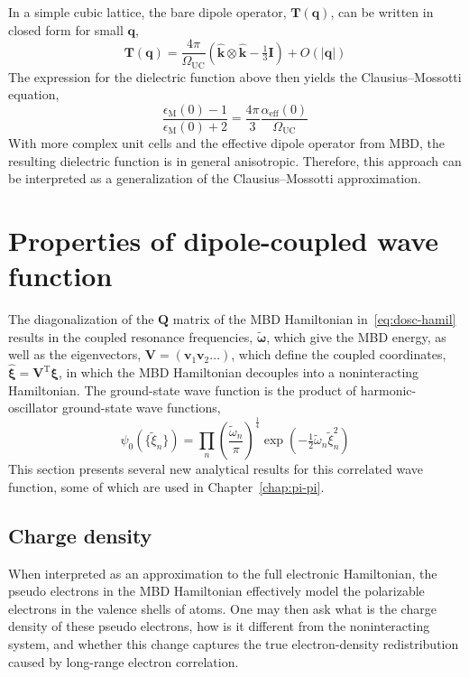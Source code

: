 In a simple cubic lattice, the bare dipole operator, $\mathbf T(\mathbf q)$, can be written in closed form for small $\mathbf q$,
\begin{equation}
  \mathbf T(\mathbf q)=\frac{4\pi}{\Omega_{\text{UC}}}(\hat{\mathbf k}\otimes\hat{\mathbf k}-\tfrac13\mathbf I)+O(|\mathbf q|)
\end{equation}
The expression for the dielectric function above then yields the Clausius--Mossotti equation,
\begin{equation}
  \frac{\epsilon_\text{M}(0)-1}{\epsilon_\text{M}(0)+2}=\frac{4\pi}3\frac{\alpha_\text{eff}(0)}{\Omega_\text{UC}}
\end{equation}
With more complex unit cells and the effective dipole operator from MBD, the resulting dielectric function is in general anisotropic.
Therefore, this approach can be interpreted as a generalization of the Clausius--Mossotti approximation.

\section{Properties of dipole-coupled wave function}

The diagonalization of the $\mathbf Q$ matrix of the MBD Hamiltonian in~\eqref{eq:dosc-hamil} results in the coupled resonance frequencies, $\tilde{\boldsymbol\omega}$, which give the MBD energy, as well as the eigenvectors, $\mathbf V=(\mathbf v_1\mathbf v_2\ldots)$, which define the coupled coordinates, $\hat{\boldsymbol\xi}=\mathbf V^\mathrm T\boldsymbol\xi$, in which the MBD Hamiltonian decouples into a noninteracting Hamiltonian.
The ground-state wave function is the product of harmonic-oscillator ground-state wave functions,
\begin{equation}
\psi_0(\{\tilde\xi_n\})=\prod_n\left(\frac{\tilde\omega_n}{\pi}\right)^\frac14\exp\left(-\tfrac12\tilde\omega_n\tilde\xi_n^2\right)
\label{eq:mbd-wave}
\end{equation}
This section presents several new analytical results for this correlated wave function, some of which are used in Chapter~\ref{chap:pi-pi}.

\subsection{Charge density}

When interpreted as an approximation to the full electronic Hamiltonian, the pseudo electrons in the MBD Hamiltonian effectively model the polarizable electrons in the valence shells of atoms.
One may then ask what is the charge density of these pseudo electrons, how is it different from the noninteracting system, and whether this change captures the true electron-density redistribution caused by long-range electron correlation.

